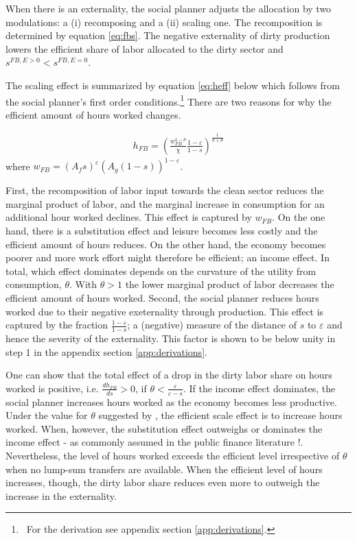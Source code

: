 When there is an externality, the social planner adjusts the allocation by two modulations: a (i) recomposing and a (ii) scaling one. 
The recomposition is determined by equation \ref{eq:fbs}. The negative externality of dirty production lowers the efficient share of labor allocated to  the dirty sector and $s^{FB,E>0}<s^{FB,E=0}$. 

The scaling effect is summarized by equation \ref{eq:heff} below which follows from the social planner's first order conditions.\footnote{\ For the derivation see appendix section \ref{app:derivations}.} There are two reasons for why the efficient amount of hours worked changes. 

\begin{align}
h_{FB}= \left(\frac{w_{FB}^{1-\theta}}{\chi}\frac{1-\varepsilon}{1-s}\right)^\frac{1}{\sigma+\theta}\label{eq:heff}
\end{align}
where $w_{FB}=(A_f s)^{\varepsilon}(A_g(1-s))^{1-\varepsilon}$.


First, the recomposition of labor input towards the  clean sector reduces the marginal product of labor, and the marginal increase in consumption for an additional hour worked declines.  This effect is captured by $w_{FB}$. On the one hand, there is a substitution effect and leisure becomes less costly and the efficient amount of hours reduces. On the other hand, the economy becomes poorer and more work effort might therefore be efficient; an income effect. In total, which effect dominates depends on the curvature of the utility from consumption, $\theta$. With $\theta>1$ the  lower marginal product of labor decreases the efficient amount of hours worked. 
Second, the social planner reduces hours worked due to their negative exeternality through production. This effect is captured by the fraction $\frac{1-\varepsilon}{1-s}$; a (negative) measure of the distance of $s$ to $\varepsilon$ and hence the severity of the externality. This factor is shown to be below unity in step 1 in the appendix section \ref{app:derivations}.

One can show that the total effect of a drop in the dirty labor share on hours worked is positive, i.e. $\frac{dh_{FB}}{ds}>0$, if $\theta<\frac{\varepsilon}{\varepsilon-s}$. If the income effect dominates, the social planner increases hours worked as the economy becomes less productive. 
Under the value for $\theta$ suggested by \cite{Boppart2019LaborPerspectiveb}, the efficient scale effect is to increase hours worked. When, however, the substitution effect outweighs or dominates the income effect - as commonly assumed in the public finance literature \citep{Heathcote2017OptimalFramework, LansBovenberg1994EnvironmentalTaxation, LansBovenberg1996OptimalAnalyses} !.
Nevertheless, the level of hours worked exceeds the efficient level irrespective of $\theta$ when no lump-sum transfers are available. 
When the efficient level of hours increases, though, the dirty labor share reduces even more to outweigh the increase in the externality.

